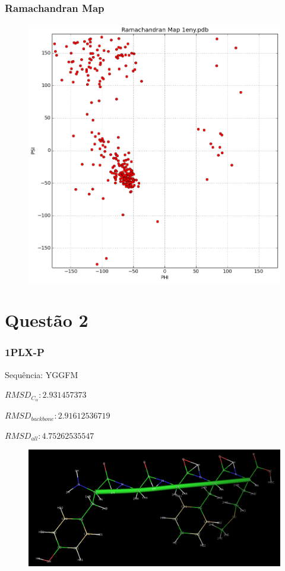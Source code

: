 \documentclass{beamer}
\begin{document}
\begin{frame}
\frametitle{Ramachandran Map}
\begin{figure}
\includegraphics[width=0.6\linewidth]{1eny.png}
\end{figure}
\end{frame}

\section{Questão 2} 

\begin{frame}
\frametitle{1PLX-P}
Sequência: YGGFM

$RMSD_{C_\alpha}: 2.931457373$

$RMSD_{backbone}: 2.91612536719$

$RMSD_{all}: 4.75262535547$ 

\begin{figure}
\includegraphics[width=1.0\linewidth]{1PLX-P.png}
\end{figure}
\end{frame}
\end{document}
